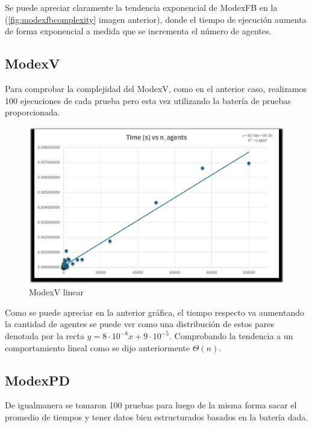 \documentclass[letterpaper,10pt]{article}
\begin{document}
Se puede apreciar claramente la tendencia exponencial de ModexFB en la (\ref{fig:modexfbcomplexity} imagen anterior), donde el tiempo de ejecución aumenta de forma exponencial a medida que se incrementa el número de agentes.

\subsection{ModexV}
Para comprobar la complejidad del ModexV, como en el anterior caso, realizamos 100 ejecuciones de cada prueba pero esta vez utilizando la batería de pruebas proporcionada. 


\begin{figure}[H]
  \centering
  \begin{minipage}{1\textwidth}
    \centering
    \includegraphics[width=\textwidth]{Images/modexvcomplexity.png}
  \end{minipage}
  \caption{ModexV linear} 
  \label{fig:modexvcomplexity}
\end{figure}
Como se puede apreciar en la anterior gráfica, el tiempo respecto va aumentando la cantidad de agentes se puede ver como una distribución de estos pares denotada por la recta $y=8\cdot 10^{-8}x+9\cdot10^{-5}$.
Comprobando la tendencia a un comportamiento lineal como se dijo anteriormente $\Theta(n)$.

\newpage
\subsection{ModexPD}
De igualmanera se tomaron 100 pruebas para luego de la misma forma sacar el promedio de tiempos y tener datos bien estructurados basados en la batería dada.
\end{document}
